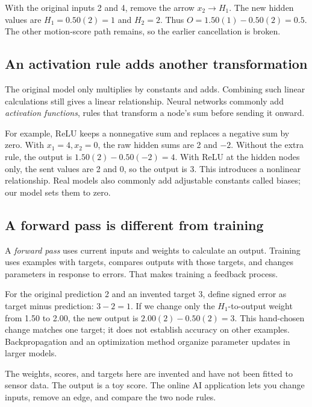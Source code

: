 \documentclass[11pt,letterpaper]{article}
\begin{document}
\begin{tcolorbox}[title={Remove one edge and test again}]
With the original inputs 2 and 4, remove the arrow $x_2\to H_1$. The new hidden values are $H_1=0.50(2)=1$ and $H_2=2$. Thus $O=1.50(1)-0.50(2)=0.5$. The other motion-score path remains, so the earlier cancellation is broken.
\end{tcolorbox}

\subsection*{An activation rule adds another transformation}
The original model only multiplies by constants and adds. Combining such linear calculations still gives a linear relationship. Neural networks commonly add \emph{activation functions}, rules that transform a node's sum before sending it onward.

For example, ReLU keeps a nonnegative sum and replaces a negative sum by zero. With $x_1=4,x_2=0$, the raw hidden sums are 2 and $-2$. Without the extra rule, the output is $1.50(2)-0.50(-2)=4$. With ReLU at the hidden nodes only, the sent values are 2 and 0, so the output is 3. This introduces a nonlinear relationship. Real models also commonly add adjustable constants called biases; our model sets them to zero.

\subsection*{A forward pass is different from training}
A \emph{forward pass} uses current inputs and weights to calculate an output. Training uses examples with targets, compares outputs with those targets, and changes parameters in response to errors. That makes training a feedback process.

For the original prediction 2 and an invented target 3, define signed error as target minus prediction: $3-2=1$. If we change only the $H_1$-to-output weight from 1.50 to 2.00, the new output is $2.00(2)-0.50(2)=3$. This hand-chosen change matches one target; it does not establish accuracy on other examples. Backpropagation and an optimization method organize parameter updates in larger models.

The weights, scores, and targets here are invented and have not been fitted to sensor data. The output is a toy score. The online AI application lets you change inputs, remove an edge, and compare the two node rules.

\clearpage
\end{document}
